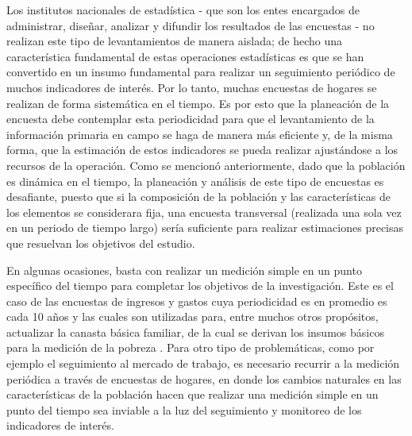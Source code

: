 \documentclass[12pt,spanish,]{book}
\begin{document}
Los institutos nacionales de estadística - que son los entes encargados de administrar, diseñar, analizar y difundir los resultados de las encuestas - no realizan este tipo de levantamientos de manera aislada; de hecho una característica fundamental de estas operaciones estadísticas es que se han convertido en un insumo fundamental para realizar un seguimiento periódico de muchos indicadores de interés. Por lo tanto, muchas encuestas de hogares se realizan de forma sistemática en el tiempo. Es por esto que la planeación de la encuesta debe contemplar esta periodicidad para que el levantamiento de la información primaria en campo se haga de manera más eficiente y, de la misma forma, que la estimación de estos indicadores se pueda realizar ajustándose a los recursos de la operación. Como se mencionó anteriormente, dado que la población es dinámica en el tiempo, la planeación y análisis de este tipo de encuestas es desafiante, puesto que si la composición de la población y las características de los elementos se considerara fija, una encuesta transversal (realizada una sola vez en un periodo de tiempo largo) sería suficiente para realizar estimaciones precisas que resuelvan los objetivos del estudio.

En algunas ocasiones, basta con realizar un medición simple en un punto específico del tiempo para completar los objetivos de la investigación. Este es el caso de las encuestas de ingresos y gastos cuya periodicidad es en promedio es cada 10 años y las cuales son utilizadas para, entre muchos otros propósitos, actualizar la canasta básica familiar, de la cual se derivan los insumos básicos para la medición de la pobreza \autocite{CEPAL_2018}. Para otro tipo de problemáticas, como por ejemplo el seguimiento al mercado de trabajo, es necesario recurrir a la medición periódica a través de encuestas de hogares, en donde los cambios naturales en las características de la población hacen que realizar una medición simple en un punto del tiempo sea inviable a la luz del seguimiento y monitoreo de los indicadores de interés.
\end{document}
